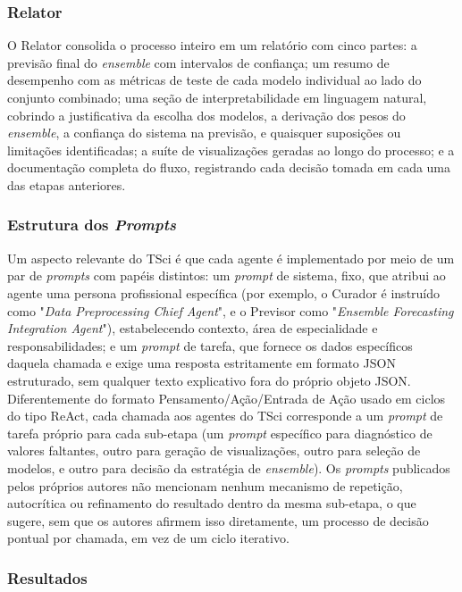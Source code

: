 \subsubsection{Relator}

O Relator consolida o processo inteiro em um relatório com cinco partes: a previsão final do \textit{ensemble} com intervalos de confiança; um resumo de desempenho com as métricas de teste de cada modelo individual ao lado do conjunto combinado; uma seção de interpretabilidade em linguagem natural, cobrindo a justificativa da escolha dos modelos, a derivação dos pesos do \textit{ensemble}, a confiança do sistema na previsão, e quaisquer suposições ou limitações identificadas; a suíte de visualizações geradas ao longo do processo; e a documentação completa do fluxo, registrando cada decisão tomada em cada uma das etapas anteriores.

\subsubsection{Estrutura dos \textit{Prompts}}

Um aspecto relevante do TSci é que cada agente é implementado por meio de um par de \textit{prompts} com papéis distintos: um \textit{prompt} de sistema, fixo, que atribui ao agente uma persona profissional específica (por exemplo, o Curador é instruído como "\textit{Data Preprocessing Chief Agent}", e o Previsor como "\textit{Ensemble Forecasting Integration Agent}"), estabelecendo contexto, área de especialidade e responsabilidades; e um \textit{prompt} de tarefa, que fornece os dados específicos daquela chamada e exige uma resposta estritamente em formato JSON estruturado, sem qualquer texto explicativo fora do próprio objeto JSON. Diferentemente do formato Pensamento/Ação/Entrada de Ação usado em ciclos do tipo ReAct, cada chamada aos agentes do TSci corresponde a um \textit{prompt} de tarefa próprio para cada sub-etapa (um \textit{prompt} específico para diagnóstico de valores faltantes, outro para geração de visualizações, outro para seleção de modelos, e outro para decisão da estratégia de \textit{ensemble}). Os \textit{prompts} publicados pelos próprios autores não mencionam nenhum mecanismo de repetição, autocrítica ou refinamento do resultado dentro da mesma sub-etapa, o que sugere, sem que os autores afirmem isso diretamente, um processo de decisão pontual por chamada, em vez de um ciclo iterativo.

\subsubsection{Resultados}

